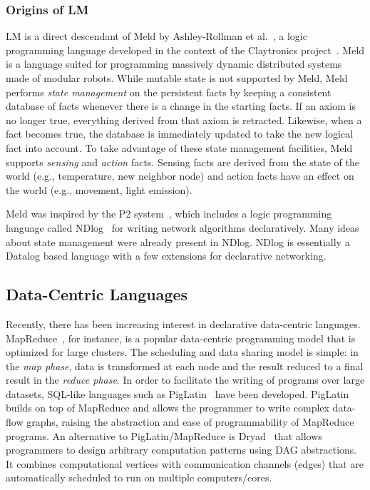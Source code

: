 \subsubsection{Origins of LM}

LM is a direct descendant of Meld by Ashley-Rollman et
al.~\cite{ashley-rollman-iclp09,ashley-rollman-derosa-iros07wksp}, a logic
programming language developed in the context of the Claytronics
project~\cite{goldstein-computer05}. Meld is a language suited for programming
massively dynamic distributed systems made of modular robots. While mutable
state is not supported by Meld, Meld performs \emph{state management} on the
persistent facts by keeping a consistent database of facts whenever there is a
change in the starting facts. If an axiom is no longer true, everything derived
from that axiom is retracted. Likewise, when a fact becomes true, the database
is immediately updated to take the new logical fact into account. To take
advantage of these state management facilities, Meld supports \emph{sensing} and
\emph{action} facts. Sensing facts are derived from the state of the world
(e.g., temperature, new neighbor node) and action facts have an
effect on the world (e.g., movement, light emission).

Meld was inspired by the P2 system~\cite{Loo-condie-garofalakis-p2}, which
includes a logic programming language called NDlog~\cite{Loo:EECS-2006-177} for
writing network algorithms declaratively. Many ideas about state management were
already present in NDlog.  NDlog is essentially a Datalog based language with a
few extensions for declarative networking.
\subsection{Data-Centric Languages}

Recently, there has been increasing interest in declarative data-centric
languages. MapReduce~\cite{Dean:2008:MSD:1327452.1327492}, for instance, is a
popular data-centric programming model that is optimized for large clusters. The
scheduling and data sharing model is simple: in the \emph{map phase}, data
is transformed at each node and the result reduced to a final result in the
\emph{reduce phase}. In order to facilitate the writing of programs over large
datasets, SQL-like languages such as
PigLatin~\cite{Olston:2008:PLN:1376616.1376726} have been developed. PigLatin
builds on top of MapReduce and allows the programmer to write complex data-flow
graphs, raising the abstraction and ease of programmability of MapReduce
programs. An alternative to PigLatin/MapReduce is
Dryad~\cite{Isard:2007:DDD:1272996.1273005} that allows programmers to design
arbitrary computation patterns using DAG abstractions. It combines computational
vertices with communication channels (edges) that are automatically scheduled to
run on multiple computers/cores.

